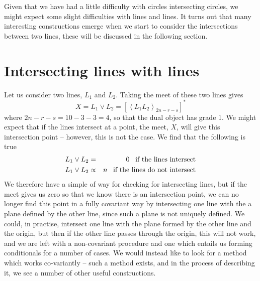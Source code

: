 Given that we have had a little difficulty with circles
intersecting circles, we might expect some slight
difficulties with lines and lines. It turns out that many
interesting constructions emerge when we start to
consider the intersections between two lines, these will
be discussed in the following section.


\section{Intersecting lines with lines }

Let us consider two lines, $L_1$ and $L_2$. Taking the
meet of these two lines gives
%
\begin{equation}
X = L_1 \vee L_2 = \left[\left< L_1 L_2
\right>_{2n-r-s}\right]^*
\end{equation}
%
where $2n-r-s=10-3-3=4$, so that the dual object has
grade 1. We might expect that if the lines intersect at a
point, the meet, $X$, will give this intersection point
-- however, this is not the case. We find that the
following is true
%
\begin{eqnarray}
L_1 \vee L_2 & = & 0 \;\;\; \mbox{if the lines intersect}
\nonumber \\
L_1 \vee L_2 & \propto & n \;\;\; \mbox{if the lines do
not intersect}
\end{eqnarray}
%
We therefore have a simple of way for checking for
intersecting lines, but if the meet gives us zero so that
we know there is an intersection point, we can no longer
find this point in a fully covariant way by intersecting
one line with the a plane defined by the other line,
since such a plane is not uniquely defined. We could, in
practise, intersect one line with the plane formed by the
other line and the origin, but then if the other line
passes through the origin, this will not work, and we are
left with a non-covariant procedure and one which entails
us forming conditionals for a number of cases. We would
instead like to look for a method which works co-variantly
-- such a method exists, and in the process of describing
it, we see a number of other useful constructions.

